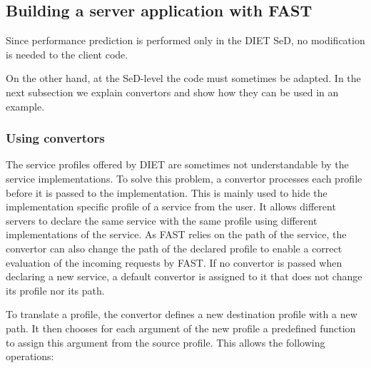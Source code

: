 \subsection{Building a server application with FAST}

Since performance prediction is performed only in the DIET SeD,
no modification is needed to the client code.

On the other hand, at the SeD-level the code must sometimes be adapted.  In
the next subsection we explain convertors and show how they can be used
in an example.

\subsubsection{Using convertors}

The service profiles offered by DIET are sometimes not
understandable by the service implementations. To solve this problem,
a convertor processes each profile before it is passed to the
implementation. This is mainly used to
hide the implementation specific profile of a service from
the user. It allows different servers to declare the same
service with the same profile using different implementations
of the service. As FAST relies on the path of the service, the
convertor can also change the path of the declared profile to
enable a correct evaluation of the incoming requests by FAST.
If no convertor is passed when declaring a new service, a
default convertor is assigned to it that does not change its
profile nor its path.

To translate a profile, the convertor defines a new
destination profile with a new path. It then chooses for
each argument of the new profile a predefined function
to assign this argument from the source profile. This
allows the following operations:

